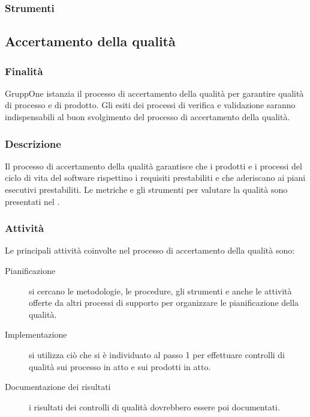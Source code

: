 \documentclass[../norme-di-progetto.tex]{subfiles}
\begin{document}
\subsubsection{Strumenti}%
\label{subs:gestione_della_configurazione/strumenti}

\subsection{Accertamento della qualità}%
\label{subs:accertamento_della_qualita}

\subsubsection{Finalità}%
\label{subs:accertamento_della_qualita/finalita}

GruppOne istanzia il processo di accertamento della qualità per garantire qualità di processo e di prodotto.
Gli esiti dei processi di verifica e validazione saranno indispensabili al buon svolgimento del processo di accertamento della qualità.

\subsubsection{Descrizione}%
\label{subs:accertamento_della_qualita/descrizione}

Il processo di accertamento della qualità garantisce che i prodotti e i processi del ciclo di vita del software rispettino i requisiti prestabiliti e che aderiscano ai piani esecutivi prestabiliti. Le metriche e gli strumenti per valutare la qualità sono presentati nel .

\subsubsection{Attività}%
\label{subs:accertamento_della_qualita/attivita}

Le principali attività coinvolte nel processo di accertamento della qualità sono:

\begin{description}
  \item [Pianificazione] si cercano le metodologie, le procedure, gli strumenti e anche le attività offerte da altri processi di supporto per organizzare le pianificazione della qualità.
  \item [Implementazione] si utilizza ciò che si è individuato al passo 1 per effettuare controlli di qualità sui processo in atto e sui prodotti in atto.
  \item [Documentazione dei risultati] i risultati dei controlli di qualità dovrebbero essere poi documentati.
\end{description}
\end{document}
